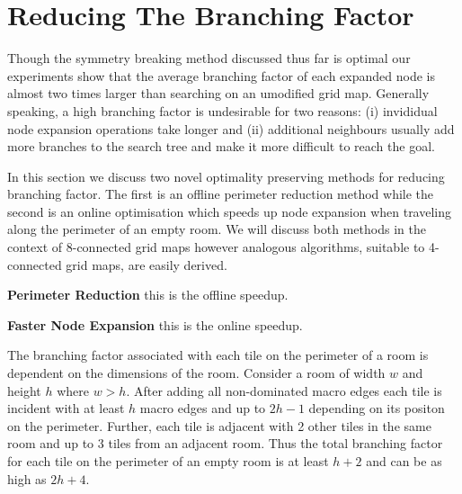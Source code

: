 \section{Reducing The Branching Factor}
Though the symmetry breaking method discussed thus far is optimal our experiments show that
 the average branching factor of each expanded node is almost two times larger than searching
on an umodified grid map.
Generally speaking, a high branching factor is undesirable for two reasons:
(i) invididual node expansion operations take longer and (ii) additional neighbours usually 
add more branches to the search tree and make it more difficult to reach the goal.
\par
In this section we discuss two novel optimality preserving methods for reducing branching factor. 
The first is an offline perimeter reduction method while the second is an online optimisation which speeds up 
node expansion when traveling along the perimeter of an empty room.
We will discuss both methods in the context of 8-connected grid maps however analogous algorithms, suitable to
 4-connected grid maps, are easily derived.
\par \noindent \newline
\textbf{Perimeter Reduction} this is the offline speedup. 
\par \noindent \newline
\textbf{Faster Node Expansion} this is the online speedup.

The branching factor associated with each tile on the perimeter of a room is dependent
on the dimensions of the room.
Consider a room of width $w$ and height $h$ where $w > h$.
After adding all non-dominated macro edges each tile is incident with at least $h$ macro edges and up to $2h-1$
depending on its positon on the perimeter.
Further, each tile is adjacent with 2 other tiles in the same room and up to 3 tiles from an adjacent room.
Thus the total branching factor for each tile on the perimeter of an empty room is at least $h + 2$ and can be as high
as $2h + 4$.

